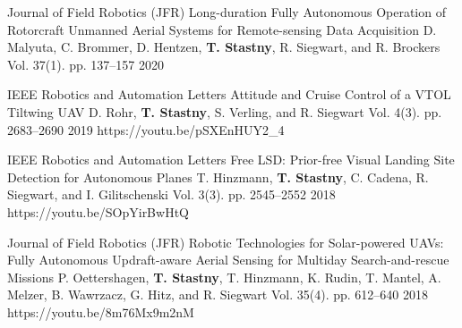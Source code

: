 \begin{cventries}


\vspace{-6pt}
\begin{flushleft}
\end{flushleft}

\begin{cvnumlist}
%
\item \cvpubentry
	{Journal of Field Robotics (JFR)} %
	{Long-duration Fully Autonomous Operation of Rotorcraft Unmanned Aerial Systems for Remote-sensing Data Acquisition} %
	{D. Malyuta, C. Brommer, D. Hentzen, \textbf{T. Stastny}, R. Siegwart, and R. Brockers} %
	{Vol. 37(1). pp. 137--157} %
	{2020} %
	{} %
	{} %

\item \cvpubentry
	{IEEE Robotics and Automation Letters} %
	{Attitude and Cruise Control of a VTOL Tiltwing UAV} %
	{D. Rohr, \textbf{T. Stastny}, S. Verling, and R. Siegwart} %
	{Vol. 4(3). pp. 2683--2690} %
	{2019} %
	{https://youtu.be/pSXEnHUY2\_4} %
	{} %

\item \cvpubentry
	{IEEE Robotics and Automation Letters} %
	{Free LSD: Prior-free Visual Landing Site Detection for Autonomous Planes} %
	{T. Hinzmann, \textbf{T. Stastny}, C. Cadena, R. Siegwart, and I. Gilitschenski} %
	{Vol. 3(3). pp. 2545--2552} %
	{2018} %
	{https://youtu.be/SOpYirBwHtQ} %
	{} %
	
\item \cvpubentry
	{Journal of Field Robotics (JFR)} %
	{Robotic Technologies for Solar-powered UAVs: Fully Autonomous Updraft-aware Aerial Sensing for Multiday Search-and-rescue Missions} %
	{P. Oettershagen, \textbf{T. Stastny}, T. Hinzmann, K. Rudin, T. Mantel, A. Melzer, B. Wawrzacz, G. Hitz, and R. Siegwart} %
	{Vol. 35(4). pp. 612--640} %
	{2018} %
	{https://youtu.be/8m76Mx9m2nM} %
	{} %


\end{cvnumlist}
\end{cventries}
